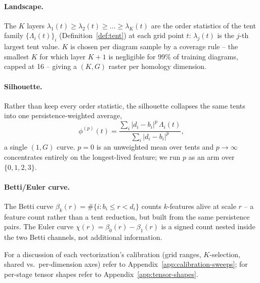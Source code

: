 \documentclass[11pt,letterpaper]{article}
\newcommand{\1}{\mathds{1}}
\theoremstyle{plain}
\theoremstyle{definitioncolon}
\begin{document}
\paragraph{Landscape.} The $K$ layers $\lambda_1(t) \geq \lambda_2(t) \geq
\dots \geq \lambda_K(t)$ are the order statistics of the tent family
$\{\Lambda_i(t)\}_i$ (Definition~\ref{def:tent}) at each grid point $t$:
$\lambda_j(t)$ is the $j$-th largest tent value. $K$ is chosen per diagram
sample by a coverage rule -- the smallest $K$ for which layer $K+1$ is
negligible for 99\% of training diagrams, capped at 16 -- giving a $(K,G)$
raster per homology dimension.

\paragraph{Silhouette.} Rather than keep every order statistic, the
silhouette collapses the same tents into one persistence-weighted average,
    \[
    \phi^{(p)}(t) = \frac{\sum_i |d_i-b_i|^p\, \Lambda_i(t)}
    {\sum_i |d_i-b_i|^p},
    \]
a single $(1,G)$ curve. $p=0$ is an unweighted mean over tents and $p \to
\infty$ concentrates entirely on the longest-lived feature; we run $p$ as an
arm over $\{0,1,2,3\}$.

\paragraph{Betti/Euler curve.} The Betti curve $\beta_k(r) = \#\{i : b_i
\leq r < d_i\}$ counts $k$-features alive at scale $r$ -- a feature count
rather than a tent reduction, but built from the same persistence pairs.
The Euler curve $\chi(r) = \beta_0(r) - \beta_1(r)$ is a signed count nested
inside the two Betti channels, not additional information.

For a discussion of each vectorization's calibration (grid ranges, $K$-selection, shared vs.\ per-dimension
axes) refer to Appendix~\ref{app:calibration-sweeps}; for per-stage tensor
shapes refer to Appendix~\ref{app:tensor-shapes}.
\end{document}
